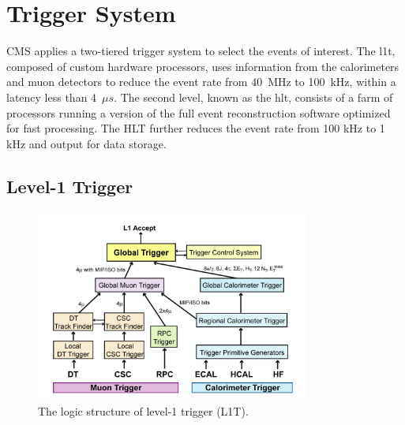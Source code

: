 \section{Trigger System}
\label{sec:cmsexperiment:trigger}

CMS applies a two-tiered trigger system \cite{cms:trigger:Khachatryan:2016bia} to select the events of interest. The \acrfull{l1t}, composed of custom hardware processors, uses information from the calorimeters and muon detectors to reduce the event rate from 40~MHz to 100~kHz, within a latency less than 4~$\mu s$. The second level, known as the \acrfull{hlt}, consists of a farm of processors running a version of the full event reconstruction software optimized for fast processing. The HLT further reduces the event rate from 100 kHz to 1 kHz and output for data storage.



\subsection{Level-1 Trigger}

\begin{figure}[ht]
    \centering
    \includegraphics[width=0.8\textwidth]{chapters/CMSExperiment/sectionTrigger/figures/trigger.png}
    \caption{The logic structure of level-1 trigger (L1T).}
    \label{fig:cmsexperiment:trigger:structure}
\end{figure}

